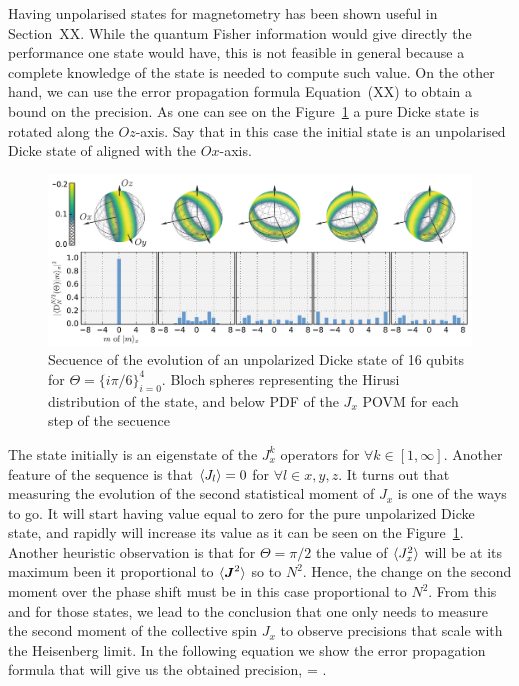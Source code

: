 Having unpolarised states for magnetometry has been shown useful in Section~XX.
While the quantum Fisher information would give directly the performance one state would have, this is not feasible in general because a complete knowledge of the state is needed to compute such value.
On the other hand, we can use the error propagation formula Equation~(XX) to obtain a bound on the precision.
As one can see on the Figure~\ref{fig:vd-secuence-evo} a pure Dicke state is rotated along the $Oz$-axis.
Say that in this case the initial state is an unpolarised Dicke state of aligned with the $Ox$-axis.
\begin{figure}
  \centering
  \includegraphics[scale=.65]{img/plots/VD_evolution_of_dicke.pdf}
  \caption{Secuence of the evolution of an unpolarized Dicke state of 16 qubits for $\Theta=\{i\pi/6\}_{i=0}^4$. Bloch spheres representing the Hirusi distribution of the state, and below PDF of the $J_x$ POVM for each step of the secuence}
  \label{fig:vd-secuence-evo}
\end{figure}

The state initially is an eigenstate of the $J_x^k$ operators for $\forall k \in [1,\infty]$.
Another feature of the sequence is that $\langle J_l \rangle=0$ for $\forall l\in x,y,z$.
It turns out that measuring the evolution of the second statistical moment of $J_x$ is one of the ways to go.
It will start having value equal to zero for the pure unpolarized Dicke state, and rapidly will increase its value as it can be seen on the Figure~\ref{fig:vd-secuence-evo}.
Another heuristic observation is that for $\Theta=\pi/2$ the value of $\langle J_x^2 \rangle$ will be at its maximum been it proportional to $\langle \boldsymbol{J}^2 \rangle$ so to $N^2$.
Hence, the change on the second moment over the phase shift must be in this case proportional to $N^2$.
From this and for those states, we lead to the conclusion that one only needs to measure the second moment of the collective spin $J_x$ to observe precisions that scale with the Heisenberg limit.
In the following equation we show the error propagation formula that will give us the obtained precision,
\be
  \varian{\Theta} = .
  \label{eq:vd-error-propagation}
\ee

